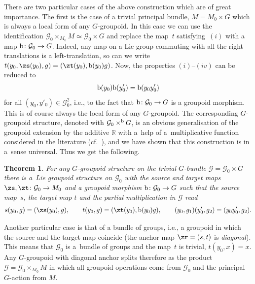 \documentclass[pdftex]{sigma}
\newcommand{\rmb}{\textnormal{b}}
\newcommand{\R}{{\mathbb R}}
\newcommand{\ti}{\times}
\def\cG{\mathcal{G}}
\numberwithin{equation}{section}
\newtheorem{Theorem}{Theorem}[section]
\begin{document}
There are two particular cases of the above construction which are of great importance. The f\/irst is the case of a trivial principal bundle, $M=M_0\ti G$ which is always a local form of any $G$-groupoid. In this case we can use the identif\/ication $\cG_0\times_{M_0}M\simeq\cG_0\times G$ and replace the map~$t$ satisfying~$(i)$ with a map $\rmb\colon \cG_0\to G$. Indeed, any map on a Lie group commuting with all the right-translations is a left-translation, so can we write $t(y_0,\zs(y_0),g)=(\zt(y_0),\rmb(y_0)g)$. Now, the properties $(i)$--$(iv)$ can be reduced to
\begin{gather*}%
\rmb(y_0)\rmb(y'_0)=\rmb(y_0y'_0)
\end{gather*}
for all $(y_0,y'_0)\in\cG_0^2$, i.e., to the fact that $\rmb\colon \cG_0\to G$ is a groupoid morphism. This is of course always the local form of any $G$-groupoid. The corresponding $G$-groupoid structure, denoted with $\cG_0\ti^\rmb G$, is an obvious generalisation of the groupoid extension by the additive $\R$ with a~help of a~multiplicative function considered in the literature (cf.~\cite[Def\/inition~2.3]{Crainic:2007}), and we have shown that this construction is in a~sense universal. Thus we get the following.
\begin{Theorem}\label{trivialsplit} For any $G$-groupoid structure on the trivial $G$-bundle $\cG=\cG_0\ti G$ there is a~Lie groupoid structure on $\cG_0$ with the source and target maps $\zs,\zt\colon \cG_0\to M_0$ and a groupoid morphism $\rmb\colon \cG_0\to G$ such that the source map~$s$, the target map $t$ and the partial multiplication in $\cG$ read
\begin{gather*}s(y_0,g)=(\zs(y_0), g),\qquad t(y_0,g)=(\zt(y_0),\rmb(y_0)g),\qquad (y_0,g_1)(y'_0,g_2)=(y_0y'_0,g_2).
\end{gather*}
\end{Theorem}

Another particular case is that of a bundle of groups, i.e., a groupoid in which the source and the target map coincide (the anchor map $\zr=(s,t)$ is \emph{diagonal}). This means that $\cG_0$ is a~bundle of groups and the map~$t$ is trivial, $t(y_0,x)=x$. Any $G$-groupoid with diagonal anchor splits therefore as the product $\cG=\cG_0\times_{M_0}M$ in which all groupoid operations come from $\cG_0$ and the principal $G$-action from $M$.
\end{document}
